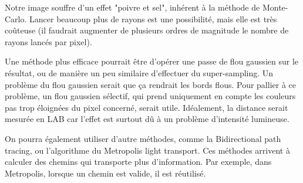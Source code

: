 \documentclass{article}
\begin{document}
Notre image souffre d'un effet "poivre et sel", inhérent à la méthode de
Monte-Carlo. Lancer beaucoup plus de rayons est une possibilité, mais elle est
très coûteuse (il faudrait augmenter de plusieurs ordres de magnitude le nombre
de rayons lancés par pixel).

Une méthode plus efficace pourrait être d'opérer
une passe de flou gaussien sur le résultat, ou de manière un peu similaire
d'effectuer du super-sampling. Un problème du flou gaussien serait que ça
rendrait les bords flous. Pour pallier à ce problème, un flou gaussien
sélectif, qui prend uniquement en compte les couleurs pas trop éloignées du
pixel concerné, serait utile. Idéalement, la distance serait mesurée en LAB car
l'effet est surtout dû à un problème d'intensité lumineuse.


On pourra également utiliser d'autre méthodes, comme la Bidirectional path
tracing, ou l'algorithme du Metropolis light transport.
Ces méthodes arrivent à calculer des chemins qui transporte plus d'information.
Par exemple, dans Metropolis, lorsque un chemin est valide, il est réutilisé.
\end{document}
